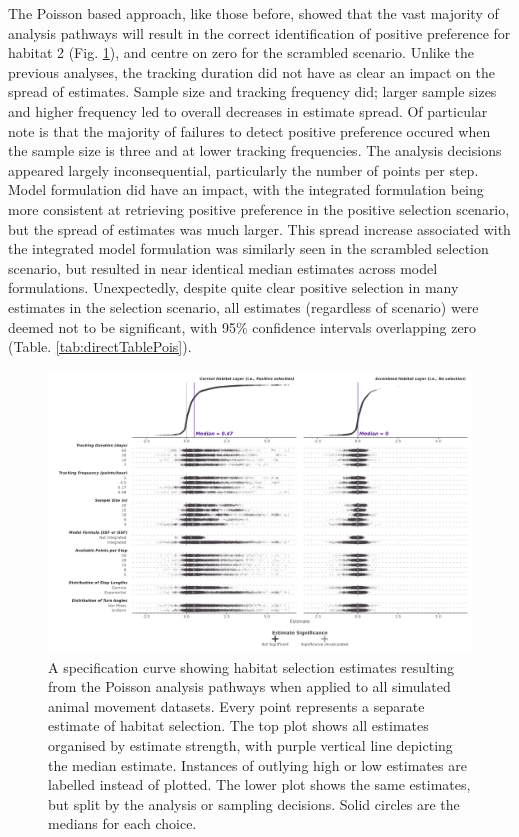 \documentclass[10pt,a4paper]{article}
\begin{document}
The Poisson based approach, like those before, showed that the vast majority of analysis pathways will result in the correct identification of positive preference for habitat 2 (Fig. \ref{fig:specCurvePois}), and centre on zero for the scrambled scenario.
Unlike the previous analyses, the tracking duration did not have as clear an impact on the spread of estimates.
Sample size and tracking frequency did; larger sample sizes and higher frequency led to overall decreases in estimate spread.
Of particular note is that the majority of failures to detect positive preference occured when the sample size is three and at lower tracking frequencies.
The analysis decisions appeared largely inconsequential, particularly the number of points per step.
Model formulation did have an impact, with the integrated formulation being more consistent at retrieving positive preference in the positive selection scenario, but the spread of estimates was much larger.
This spread increase associated with the integrated model formulation was similarly seen in the scrambled selection scenario, but resulted in near identical median estimates across model formulations.
Unexpectedly, despite quite clear positive selection in many estimates in the selection scenario, all estimates (regardless of scenario) were deemed not to be significant, with 95\% confidence intervals overlapping zero (Table. \ref{tab:directTablePois}).

\begin{figure}
\includegraphics[width=1\linewidth]{../figures/pois_specCurve} \caption{A specification curve showing habitat selection estimates resulting from the Poisson analysis pathways when applied to all simulated animal movement datasets. Every point represents a separate estimate of habitat selection. The top plot shows all estimates organised by estimate strength, with purple vertical line depicting the median estimate. Instances of outlying high or low estimates are labelled instead of plotted. The lower plot shows the same estimates, but split by the analysis or sampling decisions. Solid circles are the medians for each choice.}\label{fig:specCurvePois}
\end{figure}
\end{document}
